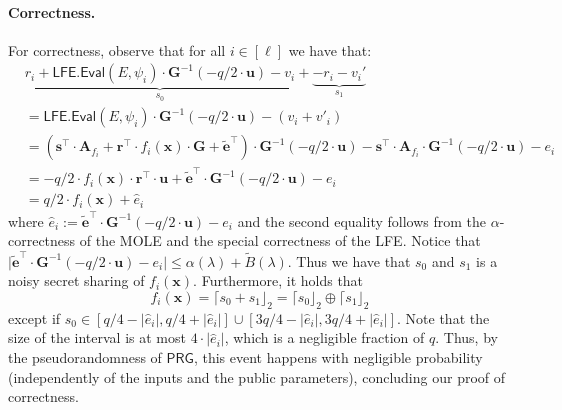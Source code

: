 \documentclass{theoretics}
\newcommand{\LFE}{\mathsf{LFE}}
\renewcommand{\sec}{\ensuremath{\lambda}}
\newcommand{\algofont}[1]{\ensuremath{\mathsf{#1}}}
\newcommand{\Eval}{\algofont{Eval}\xspace}
\begin{document}
\paragraph{Correctness.}
For correctness, observe that for all $i\in[\ell]$ we have that:
\begin{align*}
    &\underbrace{r_i + \LFE.\Eval(E, \psi_i)\cdot  \mathbf{G}^{-1}(-q/2\cdot \mathbf{u}) - v_i}_{s_0} +
    \underbrace{- r_i -v_i'}_{s_1}\\
    &=\LFE.\Eval(E, \psi_i)\cdot  \mathbf{G}^{-1}(-q/2\cdot \mathbf{u}) -(v_i +v'_i)\\
    &=(\mathbf{s}^\intercal\cdot \mathbf{A}_{f_i}+ \mathbf{r}^\intercal\cdot f_i(\mathbf{x})\cdot \mathbf{G}+\mathbf{\widetilde{e}}^\intercal)\cdot  \mathbf{G}^{-1}(-q/2\cdot \mathbf{u}) - \mathbf{s}^\intercal\cdot \mathbf{A}_{f_i}\cdot \mathbf{G}^{-1}(-q/2\cdot \mathbf{u})-e_i\\  
    &= -q/2\cdot f_i(\mathbf{x})\cdot \mathbf{r}^\intercal\cdot\mathbf{u}+ \widetilde{\mathbf{e}}^\intercal\cdot  \mathbf{G}^{-1}(-q/2\cdot \mathbf{u})-e_i\\
    &= q/2\cdot f_i(\mathbf{x}) +\hat{e}_i
\end{align*}
where $\hat{e}_i:=\widetilde{\mathbf{e}}^\intercal\cdot  \mathbf{G}^{-1}(-q/2\cdot \mathbf{u})-e_i$ and the second equality follows from the $\alpha$-correctness of the MOLE and the special correctness of the LFE. Notice that $\lvert \widetilde{\mathbf{e}}^\intercal\cdot  \mathbf{G}^{-1}(-q/2\cdot \mathbf{u})-e_i\rvert\le \alpha(\sec)+\widetilde{B}(\sec)$. Thus we have that $s_0$ and $s_1$ is a noisy secret sharing of $f_i(\mathbf{x})$. Furthermore, it holds that
\[
f_i(\mathbf{x}) = \lceil s_0 + s_1\rfloor_2
= \lceil s_0\rfloor_2 \oplus \lceil s_1\rfloor_2
\]
except if $s_0 \in [q/4 -  \lvert\hat{e}_i\rvert, q/4 + \lvert\hat{e}_i\rvert] \cup [3q/4 - \lvert\hat{e}_i\rvert, 3q/4 + \lvert\hat{e}_i\rvert]$. Note that the size of the interval is at most $ 4\cdot\lvert\hat{e}_i\rvert$, which is a negligible fraction of $q$. Thus, by the pseudorandomness of $\mathsf{PRG}$, this event happens with negligible probability {(independently of the inputs and the public parameters),} concluding our proof of correctness.
\end{document}
